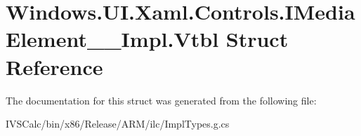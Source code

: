 \hypertarget{struct_windows_1_1_u_i_1_1_xaml_1_1_controls_1_1_i_media_element_____impl_1_1_vtbl}{}\section{Windows.\+U\+I.\+Xaml.\+Controls.\+I\+Media\+Element\+\_\+\+\_\+\+Impl.\+Vtbl Struct Reference}
\label{struct_windows_1_1_u_i_1_1_xaml_1_1_controls_1_1_i_media_element_____impl_1_1_vtbl}


The documentation for this struct was generated from the following file\+:\begin{DoxyCompactItemize}
\item 
I\+V\+S\+Calc/bin/x86/\+Release/\+A\+R\+M/ilc/Impl\+Types.\+g.\+cs\end{DoxyCompactItemize}
